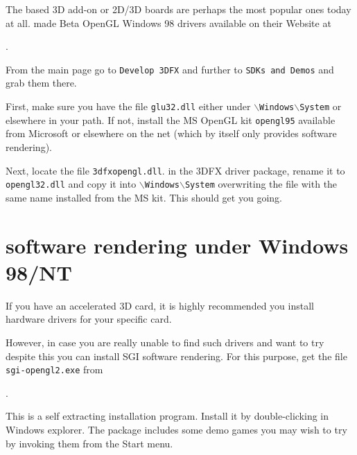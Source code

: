 The  based 3D add-on or 2D/3D boards are perhaps the
most popular ones today at all.  made Beta OpenGL
Windows 98 drivers available on their Website at

.

\noindent
 From the main page go to \texttt{Develop 3DFX} and further to \texttt{SDKs and
Demos} and grab them there.

First, make sure you have the file \texttt{glu32.dll} either under
\texttt{$\backslash$Windows$\backslash$System} or elsewhere in your path. If not, install
the MS OpenGL kit \texttt{opengl95} available from Microsoft or elsewhere on the net
(which by itself only provides software rendering).

Next, locate the file \texttt{3dfxopengl.dll}. in the 3DFX driver package, rename it to
\texttt{opengl32.dll} and copy it into \texttt{$\backslash$Windows$\backslash$System}
overwriting the file with the same name installed from the MS kit. This should get you
going.

\section{ software rendering
under Windows 98/NT\label{softrend}}

If you have an accelerated 3D card, it is highly recommended you
install hardware  drivers for your specific card.

However, in case you are really unable to find such drivers and
want to try \FlightGear despite this you can install SGI software
 rendering. For this purpose, get the file
\texttt{sgi-opengl2.exe} from

.

 \noindent
This is a  self extracting installation
program. Install it by double-clicking in Windows explorer. The
package includes some demo games you may wish to try by invoking
them from the Start menu.

